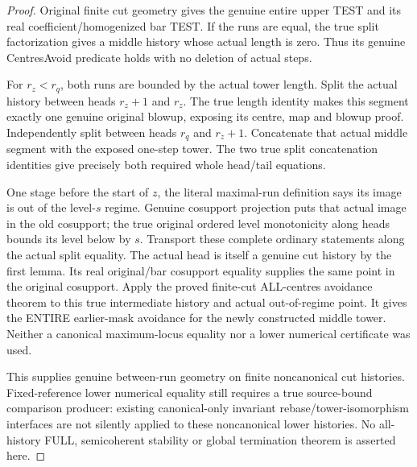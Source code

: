 \begin{proof}
Original finite cut geometry gives the genuine entire upper TEST and its
real coefficient/homogenized bar TEST. If the runs are equal, the true split
factorization gives a middle history whose actual length is zero. Thus its
genuine CentresAvoid predicate holds with no deletion of actual steps.

For $r_z<r_q$, both runs are bounded by the actual tower length. Split the
actual history between heads $r_z+1$ and $r_z$. The true length identity
makes this segment exactly one genuine original blowup, exposing its centre,
map and blowup proof. Independently split between heads $r_q$ and $r_z+1$.
Concatenate that actual middle segment with the exposed one-step tower.
The two true split concatenation identities give precisely both required
whole head/tail equations.

One stage before the start of $z$, the literal maximal-run definition says
its image is out of the level-$s$ regime. Genuine cosupport projection
puts that actual image in the old cosupport; the true original ordered
level monotonicity along heads bounds its level below by $s$. Transport
these complete ordinary statements along the actual split equality.
The actual head is itself a genuine cut history by the first lemma.
Its real original/bar cosupport equality supplies the same point in the
original cosupport. Apply the proved finite-cut ALL-centres avoidance
theorem to this true intermediate history and actual out-of-regime point.
It gives the ENTIRE earlier-mask avoidance for the newly constructed
middle tower. Neither a canonical maximum-locus equality nor a lower
numerical certificate was used.

This supplies genuine between-run geometry on finite noncanonical cut
histories. Fixed-reference lower numerical equality still requires a true
source-bound comparison producer: existing canonical-only invariant
rebase/tower-isomorphism interfaces are not silently applied to these
noncanonical lower histories. No all-history FULL, semicoherent stability
or global termination theorem is asserted here.
\end{proof}
